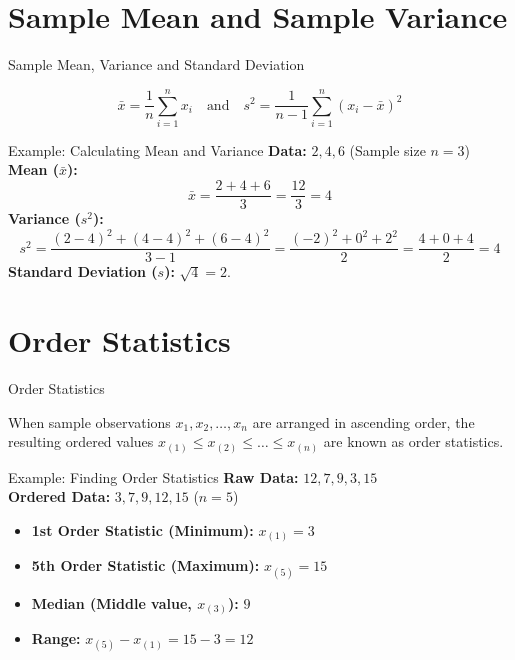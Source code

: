 \documentclass[10pt, aspectratio=169]{beamer}
\begin{document}
\section{Sample Mean and Sample Variance}

\begin{frame}{Sample Mean, Variance and Standard Deviation}
    \begin{definition}
        $$\bar{x} = \frac{1}{n} \sum_{i=1}^{n} x_i \quad \text{and} \quad s^2 = \frac{1}{n-1} \sum_{i=1}^{n} (x_i - \bar{x})^2$$
    \end{definition}

    \begin{exampleblock}{Example: Calculating Mean and Variance}
        \textbf{Data:} $2, 4, 6$ (Sample size $n=3$) \\
        \textbf{Mean ($\bar{x}$):}
        $$\bar{x} = \frac{2 + 4 + 6}{3} = \frac{12}{3} = 4$$
        \textbf{Variance ($s^2$):} 
        $$s^2 = \frac{(2-4)^2 + (4-4)^2 + (6-4)^2}{3-1} = \frac{(-2)^2 + 0^2 + 2^2}{2} = \frac{4 + 0 + 4}{2} = 4$$
        \textbf{Standard Deviation ($s$):} $\sqrt{4} = 2$.
    \end{exampleblock}
\end{frame}

\section{Order Statistics}

\begin{frame}{Order Statistics}
    \begin{definition}
        When sample observations $x_1, x_2, \dots, x_n$ are arranged in ascending order, the resulting ordered values $x_{(1)} \le x_{(2)} \le \dots \le x_{(n)}$ are known as order statistics.
    \end{definition}

    \begin{exampleblock}{Example: Finding Order Statistics}
        \textbf{Raw Data:} $12, 7, 9, 3, 15$ \\
        \textbf{Ordered Data:} $3, 7, 9, 12, 15$ ($n=5$)
        \begin{itemize}
            \item \textbf{1st Order Statistic (Minimum):} $x_{(1)} = 3$
            \item \textbf{5th Order Statistic (Maximum):} $x_{(5)} = 15$
            \item \textbf{Median (Middle value, $x_{(3)}$):} $9$
            \item \textbf{Range:} $x_{(5)} - x_{(1)} = 15 - 3 = 12$
        \end{itemize}
    \end{exampleblock}
\end{frame}
\end{document}
